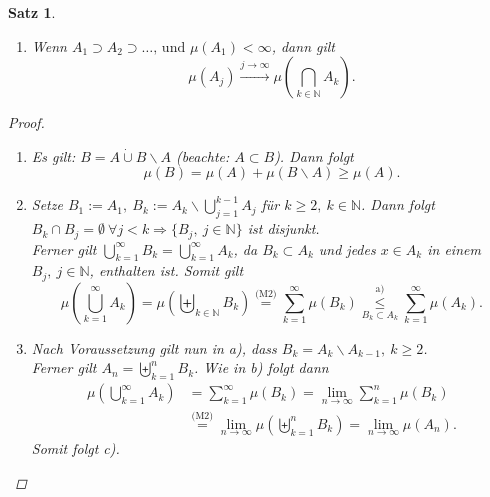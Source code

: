 \documentclass[a4paper]{scrreprt}
\newcommand{\N}{\mathbb{N}}
\newcommand{\toInf}{\rightarrow \infty}
\newcommand{\limToInf}[1]{\lim_{#1 \toInf}}
\newcommand{\dcup}{\dot{\cup}}
\newcommand{\bigdcup}{\biguplus}
\theoremstyle{plain}
\newtheorem{satz}[thm]{Satz}
\theoremstyle{definition}
\begin{document}
{{\begin{satz}
\begin{enumerate}
        \item Wenn $A_1 \supset A_2 \supset \dots \text{, und } \mu(A_1) < \infty$, dann gilt
        \begin{displaymath}
             \mu(A_j) \xrightarrow{j\rightarrow \infty} \mu \left(\bigcap_{k \in\N} A_k \right).
        \end{displaymath}
    \end{enumerate}
    \begin{proof}
        \begin{enumerate}
            \item 
                Es gilt: $B= A\dcup B\backslash A$ (beachte: $A\subset B$). Dann folgt 
                \begin{displaymath}
                    \mu(B) = \mu(A) + \mu(B\backslash A) \geq \mu(A).
                \end{displaymath}
            \item
                Setze $B_1 := A_1, \ B_k := A_k \backslash \bigcup_{j=1}^{k-1} A_j$ für $k \geq 2, \ k \in \N$. Dann folgt $B_k \cap B_j = \emptyset \ \forall j < k \Rightarrow \{B_j,\ j\in\N\}$ ist disjunkt.\\
                Ferner gilt $\bigcup_{k=1}^\infty B_k = \bigcup_{k=1}^\infty A_k$, da $B_k \subset A_k$ und jedes $x \in A_k$ in einem $B_j, \ j\in\N$, enthalten ist. Somit gilt
                \begin{displaymath}
                    \mu(\bigcup_{k=1}^\infty A_k) = \mu(\bigdcup_{k\in\N} B_k) \overset{\text{(M2)}}{=} \sum_{k=1}^\infty \mu(B_k) \overset{\text{a)}}{\underset{B_k \subset A_k}{\le}} \sum_{k=1}^\infty \mu(A_k).
                \end{displaymath}
            \item
                Nach Voraussetzung gilt nun in a), dass $B_k = A_k \backslash A_{k-1}, \ k \ge 2$.\\
                Ferner gilt $A_n = \bigdcup_{k=1}^n B_k$. Wie in b) folgt dann
                \begin{displaymath}
                    \begin{split}
                        \mu(\bigcup_{k=1}^\infty A_k) &= \sum_{k=1}^\infty \mu(B_k) = \limToInf{n} \sum_{k=1}^n \mu(B_k)\\
                        &\overset{\text{(M2)}}{=} \limToInf{n} \mu(\bigdcup_{k=1}^n B_k) = \limToInf{n} \mu(A_n).
                    \end{split}
                \end{displaymath}
                Somit folgt c).
        \end{enumerate}
    \end{proof}
\end{satz}
}}
\end{document}
